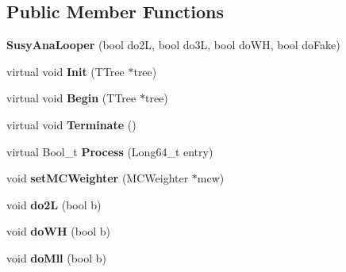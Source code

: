 \subsection*{Public Member Functions}
\begin{DoxyCompactItemize}
\item 
\hypertarget{classSusyAnaLooper_a62c8f06274c7c1e4e453ca18d236f522}{
{\bfseries SusyAnaLooper} (bool do2L, bool do3L, bool doWH, bool doFake)}
\label{classSusyAnaLooper_a62c8f06274c7c1e4e453ca18d236f522}

\item 
\hypertarget{classSusyAnaLooper_a37e438cc3d5d99c2b91ef1c19a68af75}{
virtual void {\bfseries Init} (TTree $\ast$tree)}
\label{classSusyAnaLooper_a37e438cc3d5d99c2b91ef1c19a68af75}

\item 
\hypertarget{classSusyAnaLooper_aae83c4cbdc242a5ee522f511d8db4499}{
virtual void {\bfseries Begin} (TTree $\ast$tree)}
\label{classSusyAnaLooper_aae83c4cbdc242a5ee522f511d8db4499}

\item 
\hypertarget{classSusyAnaLooper_a5d0f21b66aa21e2183dfcd8d17f78f6e}{
virtual void {\bfseries Terminate} ()}
\label{classSusyAnaLooper_a5d0f21b66aa21e2183dfcd8d17f78f6e}

\item 
\hypertarget{classSusyAnaLooper_a6ed3a9c898f025edceb668140a40936f}{
virtual Bool\_\-t {\bfseries Process} (Long64\_\-t entry)}
\label{classSusyAnaLooper_a6ed3a9c898f025edceb668140a40936f}

\item 
\hypertarget{classSusyAnaLooper_a1f21e974177b70f9145cffda05c8bd64}{
void {\bfseries setMCWeighter} (MCWeighter $\ast$mcw)}
\label{classSusyAnaLooper_a1f21e974177b70f9145cffda05c8bd64}

\item 
\hypertarget{classSusyAnaLooper_a74f1991be8d6afb842bc3e6636066ecc}{
void {\bfseries do2L} (bool b)}
\label{classSusyAnaLooper_a74f1991be8d6afb842bc3e6636066ecc}

\item 
\hypertarget{classSusyAnaLooper_afb7a243343611dd795d52d030a4f5615}{
void {\bfseries doWH} (bool b)}
\label{classSusyAnaLooper_afb7a243343611dd795d52d030a4f5615}

\item 
\hypertarget{classSusyAnaLooper_a68ac165ca3c057d74cdd56e0b5bc73eb}{
void {\bfseries doMll} (bool b)}
\label{classSusyAnaLooper_a68ac165ca3c057d74cdd56e0b5bc73eb}


\end{DoxyCompactItemize}
